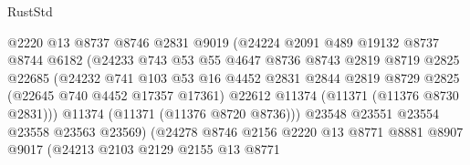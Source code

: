 \begin{lexlean}{RustStd}
\begin{coremodule}
                                @2220
                                @13
                                @8737
                                @8746
                                @2831
                                @9019
                                (@24224
                                  @2091
                                  @489
                                  @19132
                                  @8737
                                  @8744
                                  @6182
                                  (@24233
                                    @743
                                    @53
                                    @55
                                    @4647
                                    @8736
                                    @8743
                                    @2819
                                    @8719
                                    @2825
                                    @22685
                                    (@24232
                                      @741
                                      @103
                                      @53
                                      @16
                                      @4452
                                      @2831
                                      @2844
                                      @2819
                                      @8729
                                      @2825
                                      (@22645 @740 @4452 @17357 @17361)
                                      @22612
                                      @11374
                                      (@11371 (@11376 @8730 @2831)))
                                    @11374
                                    (@11371 (@11376 @8720 @8736)))
                                  @23548
                                  @23551
                                  @23554
                                  @23558
                                  @23563
                                  @23569)
                                (@24278
                                  @8746
                                  @2156
                                  @2220
                                  @13
                                  @8771
                                  @8881
                                  @8907
                                  @9017
                                  (@24213
                                    @2103
                                    @2129
                                    @2155
                                    @13
                                    @8771

\end{coremodule}
\end{lexlean}
